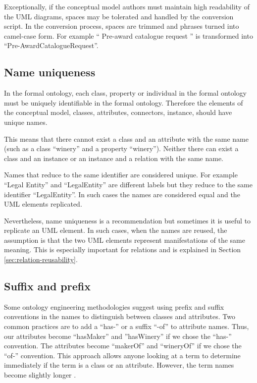 	Exceptionally, if the conceptual model authors must maintain high readability of the UML diagrams, spaces may be tolerated and handled by the conversion script. In the conversion process, spaces are trimmed and phrases turned into camel-case form. For example `` Pre-award catalogue request '' is transformed into ``Pre-AwardCatalogueRequest''. 
	
	\subsection{Name uniqueness}
	\label{sec:uniqueness}
	
	In the formal ontology, each class, property or individual in the formal ontology must be uniquely identifiable in the formal ontology. Therefore the elements of the conceptual model, classes, attributes, connectors, instance, should have unique names. 
	
	This means that there cannot exist a class and an attribute with the same name (such as a class ``winery'' and a property ``winery''). Neither there can exist a class and an instance or an instance and a relation with the same name. 

	Names that reduce to the same identifier are considered unique. For example ``Legal Entity'' and ``LegalEntity'' are different labels but they reduce to the same identifier ``LegalEntity''. In such cases the names are considered equal and the UML elements replicated.
	
	Nevertheless, name uniqueness is a recommendation but sometimes it is useful to replicate an UML element. In such cases, when the names are reused, the assumption is that the two UML elements represent manifestations of the same meaning. This is especially important for relations and is explained in Section \ref{sec:relation-reusability}.	
	
	\subsection{Suffix and prefix}
	\label{sec:suffix-prefix}
	
	Some ontology engineering methodologies suggest using prefix and suffix conventions in the names to distinguish between classes and attributes. Two common practices are to add a ``has-'' or a suffix ``-of'' to attribute names. Thus, our attributes become ``hasMaker'' and ''hasWinery'' if we chose the ``has-'' convention. The attributes become ``makerOf'' and ``wineryOf'' if we chose the ``of-'' convention. This approach allows anyone looking at a term to determine immediately if the term is a class or an attribute. However, the term names become slightly longer \cite{noy2001}.
	
